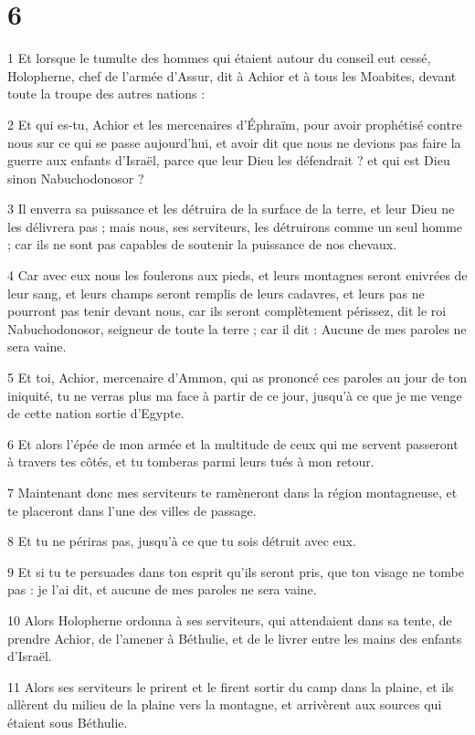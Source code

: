 \chapter{6}

\par 1 Et lorsque le tumulte des hommes qui étaient autour du conseil eut cessé, Holopherne, chef de l'armée d'Assur, dit à Achior et à tous les Moabites, devant toute la troupe des autres nations :
\par 2 Et qui es-tu, Achior et les mercenaires d'Éphraïm, pour avoir prophétisé contre nous sur ce qui se passe aujourd'hui, et avoir dit que nous ne devions pas faire la guerre aux enfants d'Israël, parce que leur Dieu les défendrait ? et qui est Dieu sinon Nabuchodonosor ?
\par 3 Il enverra sa puissance et les détruira de la surface de la terre, et leur Dieu ne les délivrera pas ; mais nous, ses serviteurs, les détruirons comme un seul homme ; car ils ne sont pas capables de soutenir la puissance de nos chevaux.
\par 4 Car avec eux nous les foulerons aux pieds, et leurs montagnes seront enivrées de leur sang, et leurs champs seront remplis de leurs cadavres, et leurs pas ne pourront pas tenir devant nous, car ils seront complètement périssez, dit le roi Nabuchodonosor, seigneur de toute la terre ; car il dit : Aucune de mes paroles ne sera vaine.
\par 5 Et toi, Achior, mercenaire d'Ammon, qui as prononcé ces paroles au jour de ton iniquité, tu ne verras plus ma face à partir de ce jour, jusqu'à ce que je me venge de cette nation sortie d'Egypte.
\par 6 Et alors l'épée de mon armée et la multitude de ceux qui me servent passeront à travers tes côtés, et tu tomberas parmi leurs tués à mon retour.
\par 7 Maintenant donc mes serviteurs te ramèneront dans la région montagneuse, et te placeront dans l'une des villes de passage.
\par 8 Et tu ne périras pas, jusqu'à ce que tu sois détruit avec eux.
\par 9 Et si tu te persuades dans ton esprit qu'ils seront pris, que ton visage ne tombe pas : je l'ai dit, et aucune de mes paroles ne sera vaine.
\par 10 Alors Holopherne ordonna à ses serviteurs, qui attendaient dans sa tente, de prendre Achior, de l'amener à Béthulie, et de le livrer entre les mains des enfants d'Israël.
\par 11 Alors ses serviteurs le prirent et le firent sortir du camp dans la plaine, et ils allèrent du milieu de la plaine vers la montagne, et arrivèrent aux sources qui étaient sous Béthulie.
